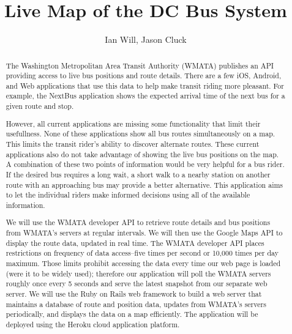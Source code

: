 \documentclass[12pt]{article}
\title{Live Map of the DC Bus System}
\author{Ian Will, Jason Cluck}
\date{}
\begin{document}
\maketitle

\begin{abstract}
The Washington Metropolitan Area Transit Authority (WMATA) publishes an API providing access to live bus positions and route details.  There are a few iOS, Android, and Web applications that use this data to help make transit riding more pleasant.  For example, the NextBus application shows the expected arrival time of the next bus for a given route and stop.

However, all current applications are missing some functionality that limit their usefullness.  None of these applications show all bus routes simultaneously on a map.  This limits the transit rider's ability to discover alternate routes.  These current applications also do not take advantage of showing the live bus positions on the map.  A combination of these two points of information would be very helpful for a bus rider.  If the desired bus requires a long wait, a short walk to a nearby station on another route with an approaching bus may provide a better alternative.  This application aims to let the individual riders make informed decisions using all of the available information.

We will use the WMATA developer API to retrieve route details and bus positions from WMATA's servers at regular intervals.  We will then use the Google Maps API to display the route data, updated in real time.  The WMATA developer API places restrictions on frequency of data access--five times per second or 10,000 times per day maximum.  Those limits prohibit accessing the data every time our web page is loaded (were it to be widely used); therefore our application will poll the WMATA servers roughly once every 5 seconds and serve the latest snapshot from our separate web server.  We will use the Ruby on Rails web framework to build a web server that maintains a database of route and position data, updates from WMATA's servers periodically, and displays the data on a map efficiently.  The application will be deployed using the Heroku cloud application platform.

\end{abstract}
\end{document}

